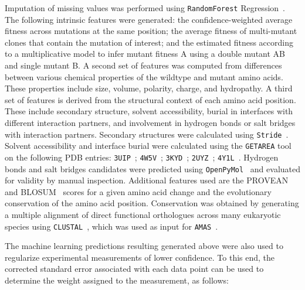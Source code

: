Imputation of missing values was performed using \texttt{RandomForest} Regression~\cite{breiman_random_2001}. The following intrinsic features were generated: the confidence-weighted average fitness across mutations at the same position; the average fitness of multi-mutant clones that contain the mutation of interest; and the estimated fitness according to a multiplicative model to infer mutant fitness A using a double mutant AB and single mutant B.
A second set of features was computed from differences between various chemical properties of the wildtype and mutant amino acids. These properties include size, volume, polarity, charge, and hydropathy.
A third set of features is derived from the structural context of each amino acid position. These include secondary structure, solvent accessibility, burial in interfaces with different interaction partners, and involvement in hydrogen bonds or salt bridges with interaction partners. Secondary structures were calculated using \texttt{Stride}~\cite{frishman_knowledge-based_1995}. Solvent accessibility and interface burial were calculated using the \texttt{GETAREA} tool~\cite{fraczkiewicz_exact_1998} on the following PDB entries: \texttt{3UIP}~\cite{gareau_determinants_2012}; \texttt{4W5V}~\cite{reiter_characterization_2016}; \texttt{3KYD}~\cite{olsen_active_2010}; \texttt{2UYZ}~\cite{knipscheer_noncovalent_2007}; \texttt{4Y1L}~\cite{alontaga_rwd_2015}. Hydrogen bonds and salt bridges candidates were predicted using \texttt{OpenPyMol}~\cite{schrodinger_pymol_2016} and evaluated for validity by manual inspection.
Additional features used are the PROVEAN~\cite{choi_predicting_2012} and BLOSUM~\cite{henikoff_amino_1992} scores for a given amino acid change and the evolutionary conservation of the amino acid position. Conservation was obtained by generating a multiple alignment of direct functional orthologues across many eukaryotic species using \texttt{CLUSTAL}~\cite{russell_clustal_2014}, which was used as input for \texttt{AMAS}~\cite{livingstone_protein_1993}.

The machine learning predictions resulting generated above were also used to regularize experimental measurements of lower confidence. To this end, the corrected standard error associated with each data point can be used to determine the weight assigned to the measurement, as follows:
 
